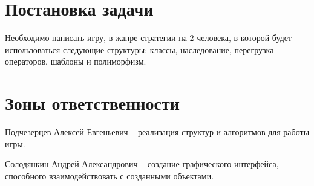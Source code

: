 \documentclass[a4paper,14pt]{article}
\begin{document}


\section{Постановка задачи}

Необходимо написать игру, в жанре стратегии на 2 человека, в которой будет использоваться следующие структуры: классы, наследование, перегрузка операторов, шаблоны и полиморфизм. 

\section{Зоны ответственности}

Подчезерцев Алексей Евгеньевич -- реализация структур и алгоритмов для работы игры.

Солодянкин Андрей Александрович -- создание графического интерфейса, способного взаимодействовать с созданными объектами.
\end{document}
